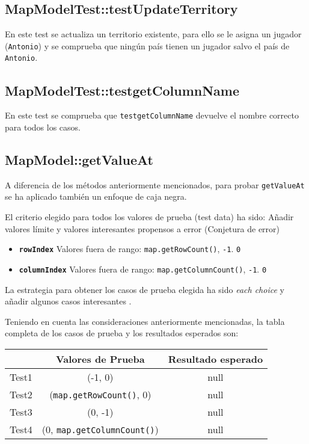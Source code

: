 \subsection {MapModelTest::testUpdateTerritory}

En este test se actualiza un territorio existente, para ello se le asigna un jugador (\texttt{Antonio}) y se comprueba que ningún país tienen un jugador salvo el país de \texttt{Antonio}. 

\subsection {MapModelTest::testgetColumnName}

En este test se comprueba que \texttt{testgetColumnName} devuelve el nombre correcto para todos los casos.

\subsection {MapModel::getValueAt}

A diferencia de  los métodos anteriormente mencionados, para probar \texttt{getValueAt} se ha aplicado también un enfoque de caja negra.

El criterio elegido para todos los valores de prueba (test data) ha sido: Añadir valores límite y valores interesantes propensos a error (Conjetura de error)  
\begin{itemize}
\item \textbf{\texttt{rowIndex}}
\subitem  Valores fuera de rango: \texttt{map.getRowCount()}, \texttt{-1}.
\subitem \texttt{0}

\item \textbf{\texttt{columnIndex}}
\subitem  Valores fuera de rango: \texttt{map.getColumnCount()}, \texttt{-1}.
\subitem \texttt{0}
\end{itemize}

La estrategia para obtener los casos de prueba elegida ha sido
\textit{each choice}  y añadir algunos casos interesantes .


Teniendo en cuenta las consideraciones anteriormente mencionadas, la tabla completa de los casos de prueba y los resultados esperados son:

{\footnotesize
\begin{longtable}[c]{lcc}
 & \textbf{Valores de Prueba}  & \textbf{Resultado esperado} \\
\hline \hline
\endhead
Test1 & (-1, 0)  & null\\
Test2 & (\texttt{map.getRowCount()}, 0) &  null\\
Test3 & (0, -1)  & null\\
Test4 & (0, \texttt{map.getColumnCount()}) &  null\\
\hline
\end{longtable}
}

